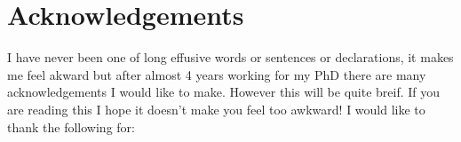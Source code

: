 




\chapter{Acknowledgements}

I have never been one of long effusive words or sentences or declarations, it makes me feel akward but after almost 4 years working for my PhD there are many acknowledgements I would like to make. However this will be quite breif. If you are reading this I hope it doesn't make you feel too awkward!
I would like to thank the following for:
